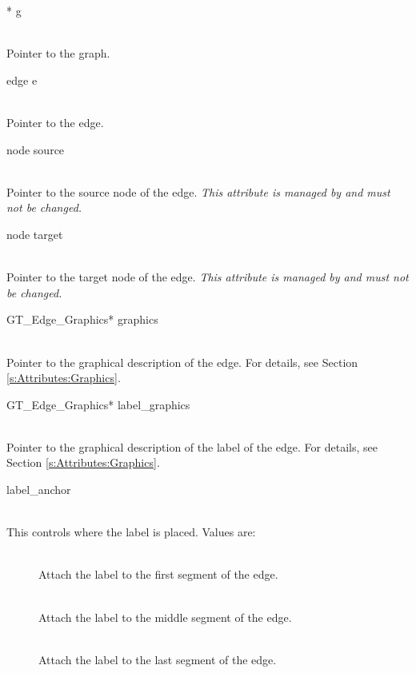 \documentclass[twoside,fleqn]{report}
\begin{document}
\begin{CAttributes}
  
  \item[\GT{Graph}* g] \strut\\
  Pointer to the graph.

  \item[edge e] \strut\\
  Pointer to the edge.

  \item[node source] \strut\\
  Pointer to the source node of the edge.  \emph{This attribute is
    managed by  and must not be changed.}
   
  \item[node target] \strut\\
  Pointer to the target node of the edge. \emph{This attribute is
    managed by  and must not be changed.}
  
  \item[GT\_Edge\_Graphics* graphics] \strut\\
  Pointer to the graphical description of the edge.  For details, see 
  Section \ref{s:Attributes:Graphics}.
  
  \item[GT\_Edge\_Graphics* label\_graphics] \strut\\
  Pointer to the graphical description of the label of the edge.  For 
  details, see Section \ref{s:Attributes:Graphics}.  
  
  \item[\GT{Key} label\_anchor] \strut\\
  This controls where the label is placed.  Values are:

  \begin{description}
    \item[] \strut\\
    Attach the label to the first segment of the edge.
    \item[] \strut\\
    Attach the label to the middle segment of the edge.
    \item[] \strut\\
    Attach the label to the last segment of the edge.
  \end{description}  


  \begin{notes}
    

\end{notes}
\end{CAttributes}
\end{document}
